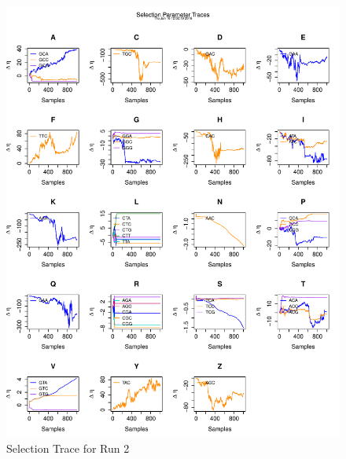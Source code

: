 \documentclass[11pt]{labbook}
\begin{document}
\begin{itemize}
\begin{figure}
            \includegraphics[scale=.65]{FONSE_Plots/2016/June_16/Run2_SelectionTrace}
            \caption{Selection Trace for Run 2}
            \label{fig:JUN16_SEL_R2}
        \end{figure}
        \begin{figure}
            \centering

\end{figure}
\end{itemize}
\end{document}
